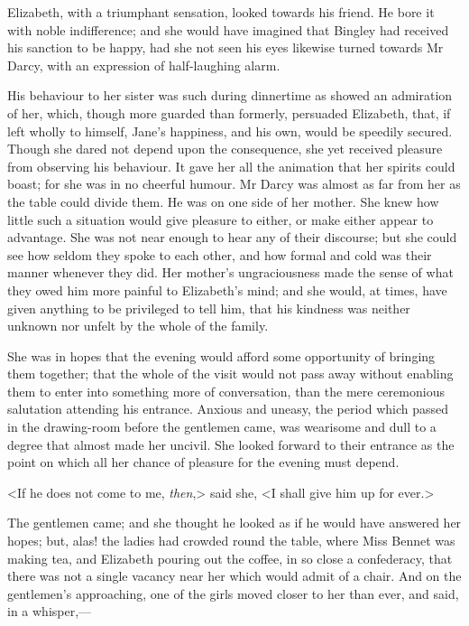 Elizabeth, with a triumphant sensation, looked towards his friend. He bore it with noble indifference; and she would have imagined that Bingley had received his sanction to be happy, had she not seen his eyes likewise turned towards Mr Darcy, with an expression of half-laughing alarm.

His behaviour to her sister was such during dinnertime as showed an admiration of her, which, though more guarded than formerly, persuaded Elizabeth, that, if left wholly to himself, Jane's happiness, and his own, would be speedily secured. Though she dared not depend upon the consequence, she yet received pleasure from observing his behaviour. It gave her all the animation that her spirits could boast; for she was in no cheerful humour. Mr Darcy was almost as far from her as the table could divide them. He was on one side of her mother. She knew how little such a situation would give pleasure to either, or make either appear to advantage. She was not near enough to hear any of their discourse; but she could see how seldom they spoke to each other, and how formal and cold was their manner whenever they did. Her mother's ungraciousness made the sense of what they owed him more painful to Elizabeth's mind; and she would, at times, have given anything to be privileged to tell him, that his kindness was neither unknown nor unfelt by the whole of the family.

She was in hopes that the evening would afford some opportunity of bringing them together; that the whole of the visit would not pass away without enabling them to enter into something more of conversation, than the mere ceremonious salutation attending his entrance. Anxious and uneasy, the period which passed in the drawing-room before the gentlemen came, was wearisome and dull to a degree that almost made her uncivil. She looked forward to their entrance as the point on which all her chance of pleasure for the evening must depend.

<If he does not come to me, \textit{then},> said she, <I shall give him up for ever.>

The gentlemen came; and she thought he looked as if he would have answered her hopes; but, alas! the ladies had crowded round the table, where Miss Bennet was making tea, and Elizabeth pouring out the coffee, in so close a confederacy, that there was not a single vacancy near her which would admit of a chair. And on the gentlemen's approaching, one of the girls moved closer to her than ever, and said, in a whisper,—

